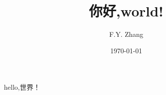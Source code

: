 \documentclass[UTF8]{ctexart}
\title{你好,world!}
\author{F.Y. Zhang}
\date{\today}
\begin{document}
\maketitle %
hello,世界！
\end{document}
